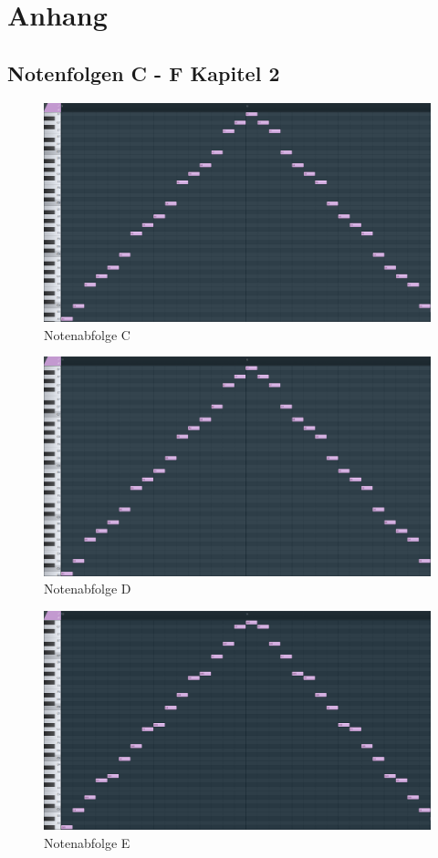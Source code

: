 \section{Anhang}

\subsection*{Notenfolgen C - F Kapitel 2}

\begin{figure}[htbp] \centering
	\includegraphics[width=.95\linewidth]{images/Noten_C.png}
	\caption{Notenabfolge C}
	\label{NotenabfolgeC}
\end{figure}

\begin{figure}[htbp] \centering
	\includegraphics[width=.95\linewidth]{images/Noten_D.png}
	\caption{Notenabfolge D}
	\label{NotenabfolgeD}
\end{figure}

\begin{figure}[htbp] \centering
	\includegraphics[width=.95\linewidth]{images/Noten_E.png}
	\caption{Notenabfolge E}
	\label{NotenabfolgeE}
\end{figure}

